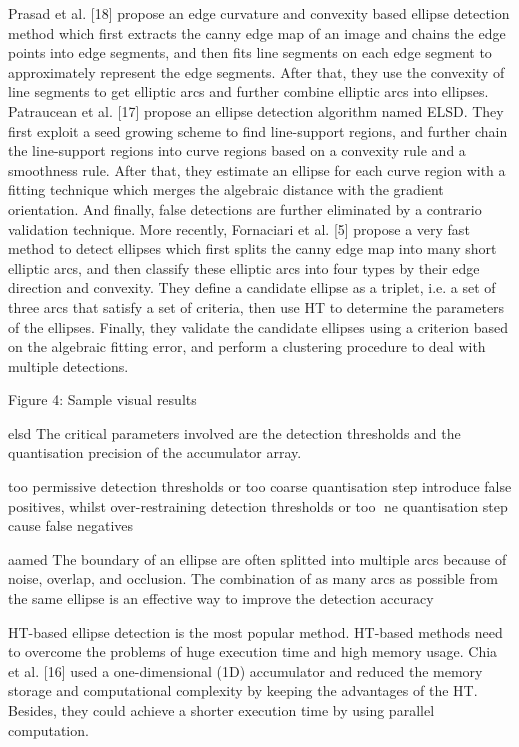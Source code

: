 \documentclass[a4paper]{report}
\begin{document}
Prasad et al. [18] propose an edge curvature and convexity
based ellipse detection method which first extracts the canny edge map of an image
and chains the edge points into edge segments, and then fits line segments on each edge
segment to approximately represent the edge segments. After that, they use the convexity of
line segments to get elliptic arcs and further combine elliptic arcs into ellipses. Patraucean
et al. [17] propose an ellipse detection algorithm named ELSD. They first exploit a seed
growing scheme to find line-support regions, and further chain the line-support regions into
curve regions based on a convexity rule and a smoothness rule. After that, they estimate an
ellipse for each curve region with a fitting technique which merges the algebraic distance
with the gradient orientation. And finally, false detections are further eliminated by a contrario
validation technique. More recently, Fornaciari et al. [5] propose a very fast method
to detect ellipses which first splits the canny edge map into many short elliptic arcs, and then
classify these elliptic arcs into four types by their edge direction and convexity. They define
a candidate ellipse as a triplet, i.e. a set of three arcs that satisfy a set of criteria, then use
HT to determine the parameters of the ellipses. Finally, they validate the candidate ellipses
using a criterion based on the algebraic fitting error, and perform a clustering procedure to
deal with multiple detections.


Figure 4: Sample visual results


elsd
The critical parameters involved are the detection thresholds and the quantisation precision
of the accumulator array.

too permissive detection thresholds
or too coarse quantisation step introduce false positives, whilst over-restraining
detection thresholds or too ne quantisation step cause false negatives

aamed
The boundary of an ellipse are often splitted
into multiple arcs because of noise, overlap, and occlusion.
The combination of as many arcs as possible from the same
ellipse is an effective way to improve the detection accuracy

HT-based ellipse detection is the most popular method.
HT-based methods need to overcome the problems of huge
execution time and high memory usage.
Chia et al. [16]
used a one-dimensional (1D) accumulator and reduced the
memory storage and computational complexity by keeping
the advantages of the HT. Besides, they could achieve a
shorter execution time by using parallel computation.
\end{document}
